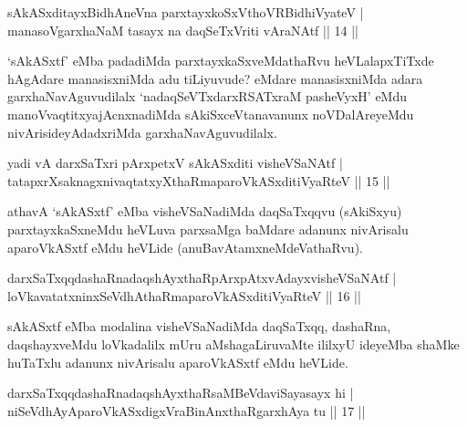 
\begin{shl}
sAkASxditayxBidhAneVna parxtayxkoSxV\s thoVR\s BidhiVyateV |\\
manasoV\s garxhaNaM tasayx na daqSeTxVriti vAraNAtf \hfill || 14 ||
\end{shl}

\begin{artha}
`sAkASxtf' eMba padadiMda parxtayxkaSxveMdathaRvu heVLalapxTiTxde hAgAdare manasisxniMda adu tiLiyuvude? eMdare manasisxniMda adara garxhaNavAguvudilalx `nadaqSeVTxdarxRSATxraM pasheVyxH' eMdu manoVvaqtitxyajAcnxnadiMda sAkiSxceVtanavanunx noVDalAreyeMdu nivArisideyAdadxriMda garxhaNavAguvudilalx.
\end{artha}


\begin{shl}
yadi vA darxSaTxri pArxpetxV sAkASxditi visheVSaNAtf |\\
tatapxrXsaknagxnivaqtatxyXthaRmaparoVkASxditiVyaRteV \hfill || 15 ||
\end{shl}

\begin{artha}
athavA `sAkASxtf' eMba visheVSaNadiMda daqSaTxqqvu (sAkiSxyu) parxtayxkaSxneMdu heVLuva parxsaMga baMdare adanunx nivArisalu aparoVkASxtf eMdu heVLide (anuBavAtamxneMdeVathaRvu).
\end{artha}


\begin{shl}
darxSaTxqqdashaRnadaqshAyxthaRpArxpAtxvAdayxvisheVSaNAtf |\\
loVkavatatxninxSeVdhAthaRmaparoVkASxditiVyaRteV \hfill || 16 ||
\end{shl}

\begin{artha}
sAkASxtf eMba modalina visheVSaNadiMda daqSaTxqq, dashaRna, daqshayxveMdu loVkadalilx mUru aMshagaLiruvaMte ililxyU ideyeMba shaMke huTaTxlu adanunx nivArisalu aparoVkASxtf eMdu heVLide.
\end{artha}

\begin{shl}
darxSaTxqqdashaRnadaqshAyxthaRsaMBeVdaviSayasayx hi |\\
niSeVdhAyAparoVkASxdigxVraBinAnxthaRgarxhAya tu \hfill || 17 ||
\end{shl}

